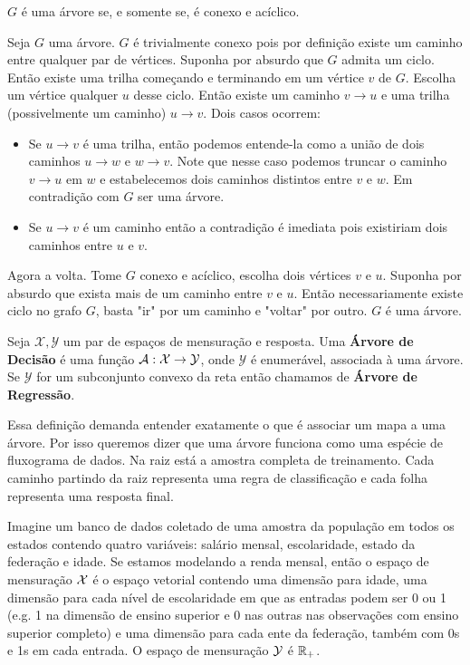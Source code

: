 \begin{teo}
$G$ é uma árvore se, e somente se, é conexo e acíclico.
\end{teo}


\begin{prova}

Seja $G$ uma árvore. $G$ é trivialmente conexo pois por definição existe um caminho entre qualquer par de vértices. Suponha por absurdo que $G$ admita um ciclo. Então existe uma trilha começando e terminando em um vértice $v$ de $G$. Escolha um vértice qualquer $u$ desse ciclo. Então existe um caminho $v \to u $ e uma trilha (possivelmente um caminho) $u \to v$. Dois casos ocorrem:

\begin{itemize}
    \item Se $u \to v$ é uma trilha, então podemos entende-la como a união de dois caminhos $u \to w$ e $w \to v$. Note que nesse caso podemos truncar o caminho $v \to u$ em $w$ e estabelecemos dois caminhos distintos entre $v$ e $w$. Em contradição com $G$ ser uma árvore.

    \item Se $u \to v$ é um caminho então a contradição é imediata pois existiriam dois caminhos entre $u$ e $v$.
\end{itemize}


Agora a volta. Tome $G$ conexo e acíclico, escolha dois vértices $v$ e $u$. Suponha por absurdo que exista mais de um caminho entre $v$ e $u$. Então necessariamente existe ciclo no grafo $G$, basta "ir" por um caminho e "voltar" por outro. $G$ é uma árvore.
\blacksquare
\end{prova}


\begin{defi}
Seja $\mathcal{X}, \mathcal{Y}$ um par de espaços de mensuração e resposta. Uma \textbf{Árvore de Decisão} é uma função $\mathcal{A}: \mathcal{X} \to \mathcal{Y}$, onde $\mathcal{Y}$ é enumerável, associada à uma árvore. Se $\mathcal{Y}$ for um subconjunto convexo da reta então chamamos de \textbf{Árvore de Regressão}.
\end{defi}

Essa definição demanda entender exatamente o que é associar um mapa a uma árvore. Por isso queremos dizer que uma árvore funciona como uma espécie de fluxograma de dados. Na raiz está a amostra completa de treinamento. Cada caminho partindo da raiz representa uma regra de classificação e cada folha representa uma resposta final. 

Imagine um banco de dados coletado de uma amostra da população em todos os estados contendo quatro variáveis: salário mensal, escolaridade, estado da federação e idade. Se estamos modelando a renda mensal, então o espaço de mensuração $\mathcal{X}$ é o espaço vetorial contendo uma dimensão para idade, uma dimensão para cada nível de escolaridade em que as entradas podem ser 0 ou 1 (e.g. 1 na dimensão de ensino superior e 0 nas outras nas observações com ensino superior completo) e uma dimensão para cada ente da federação, também com 0s e 1s em cada entrada. O espaço de mensuração $\mathcal{Y}$ é $\mathbb{R}_{+}$.


